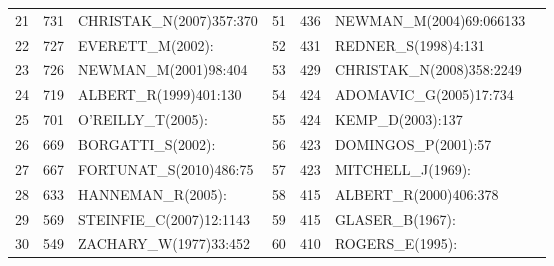 \documentclass[11pt]{article} %
\begin{document}
\begin{table}
\begin{tabular}{c|c|l||c|c|l|l}
21&   	731&   	CHRISTAK\_N(2007)357:370&   	51&   	436&   	NEWMAN\_M(2004)69:066133\\
22&   	727&   	EVERETT\_M(2002):&   	52&   	431&   	REDNER\_S(1998)4:131\\
23&   	726&   	NEWMAN\_M(2001)98:404&   	53&   	429&   	CHRISTAK\_N(2008)358:2249\\
24&   	719&   	ALBERT\_R(1999)401:130&   	54&   	424&   	ADOMAVIC\_G(2005)17:734\\
25&   	701&   	O'REILLY\_T(2005):&   	55&   	424&   	KEMP\_D(2003):137\\
26&   	669&   	BORGATTI\_S(2002):&   	56&   	423&   	DOMINGOS\_P(2001):57\\
27&   	667&   	FORTUNAT\_S(2010)486:75&   	57&   	423&   	MITCHELL\_J(1969):\\
28&   	633&   	HANNEMAN\_R(2005):&   	58&   	415&   	ALBERT\_R(2000)406:378\\
29&   	569&   	STEINFIE\_C(2007)12:1143&   	59&   	415&   	GLASER\_B(1967):\\
30&   	549&   	ZACHARY\_W(1977)33:452&   	60&   	410&   	ROGERS\_E(1995):\\ \hline
\end{tabular}
\end{table}

\end{document}
